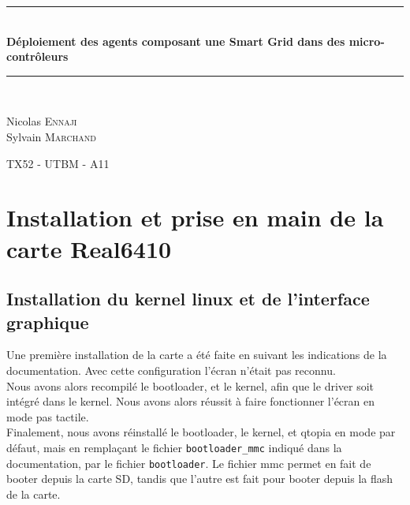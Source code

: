 \documentclass[a4,french,12pt]{article}
\newcommand{\HRule}{\rule{\linewidth}{0.5mm}}
\begin{document}
\begin{titlepage}
\begin{center}

\HRule \\[0.4cm]
{ \huge \bfseries Déploiement des agents composant une Smart Grid dans des micro-contrôleurs}\\[0.4cm]
 
\HRule \\[1.5cm]
\begin{minipage}{0.4\textwidth}
\begin{flushleft} \large

Nicolas \textsc{Ennaji} \\
Sylvain \textsc{Marchand} 

\end{flushleft}
\end{minipage}

\vfill 
{\large TX52 - UTBM - A11}

\end{center}
\end{titlepage}

\tableofcontents

\newpage

\section{Installation et prise en main de la carte Real6410}
\subsection{Installation du kernel linux et de l'interface graphique}
Une première installation de la carte a été faite en suivant les indications de la documentation. Avec cette configuration 
l'écran n'était pas reconnu. \\
Nous avons alors recompilé le bootloader, et le kernel, afin que le driver soit intégré dans le kernel. Nous avons alors 
réussit à faire fonctionner l'écran en mode pas tactile. \\
Finalement, nous avons réinstallé le bootloader, le kernel, et qtopia en mode par défaut, mais en remplaçant le fichier 
\texttt{bootloader\_mmc} indiqué dans la documentation, par le fichier \texttt{bootloader}. Le fichier mmc permet en fait de booter depuis la 
carte SD, tandis que l'autre est fait pour booter depuis la flash de la carte. %
\end{document}
